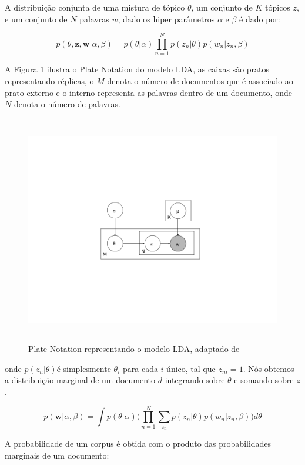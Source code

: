 \documentclass[12pt,a4paper]{article}
\begin{document}
  A distribuição conjunta de uma mistura de tópico $\theta$, um conjunto de $K$ tópicos $z$, e um conjunto de $N$ palavras $w$, dado os hiper parâmetros $\alpha$ e $\beta$ é dado por:
  
  
  \begin{equation}
  p(\theta,\textbf{z},\textbf{w}|\alpha,\beta) = p(\theta|\alpha) \prod_{n=1}^{N} p(z_n|\theta)p(w_n|z_n,\beta)
  \end{equation}
  
  
  A Figura 1 ilustra o Plate Notation do modelo LDA, as caixas são pratos representando réplicas, o $M$ denota o número de documentos que é associado ao prato externo e o interno representa as palavras dentro de um documento, onde $N$ denota o número de palavras.
  
  \begin{figure}[h]
    \centering
      \includegraphics[height=10cm]{images/figure_1.png}
      \caption{Plate Notation representando o modelo LDA, adaptado de }
  \end{figure}
  
  onde $p(z_n | \theta)$é simplesmente $\theta _i$ para cada $i$ único, tal que $z_{ni}=1$. Nós obtemos a distribuição marginal de um documento $d$ integrando sobre $\theta$ e somando sobre $z$.
  
  \begin{equation}
  p(\textbf{w}|\alpha,\beta)=\int{p(\theta|\alpha)\Bigg(\prod_{n=1}^{N}\sum_{z_n} p(z_n|\theta)p(w_n|z_n,\beta)\Bigg)d\theta}
  \end{equation}
  
  A probabilidade de um corpus é obtida com o produto das probabilidades marginais de um documento:
  
\end{document}
